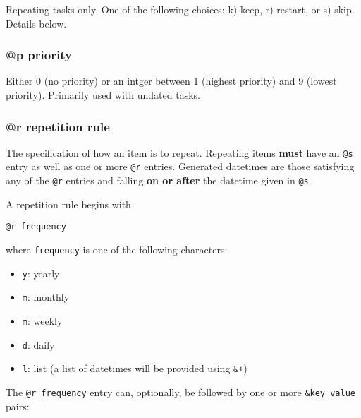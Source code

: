 \documentclass[]{article}
\begin{document}
Repeating tasks only. One of the following choices: k) keep, r) restart,
or s) skip. Details below.

\subsubsection{@p priority}

Either 0 (no priority) or an intger between 1 (highest priority) and 9
(lowest priority). Primarily used with undated tasks.

\subsubsection{@r repetition rule}

The specification of how an item is to repeat. Repeating items
\textbf{must} have an \texttt{@s} entry as well as one or more
\texttt{@r} entries. Generated datetimes are those satisfying any of the
\texttt{@r} entries and falling \textbf{on or after} the datetime given
in \texttt{@s}.

A repetition rule begins with

\begin{verbatim}
@r frequency
\end{verbatim}

where \texttt{frequency} is one of the following characters:

\begin{itemize}
\item
  \texttt{y}: yearly
\item
  \texttt{m}: monthly
\item
  \texttt{m}: weekly
\item
  \texttt{d}: daily
\item
  \texttt{l}: list (a list of datetimes will be provided using
  \texttt{\&+})
\end{itemize}

The \texttt{@r frequency} entry can, optionally, be followed by one or
more \texttt{\&key value} pairs:
\end{document}
